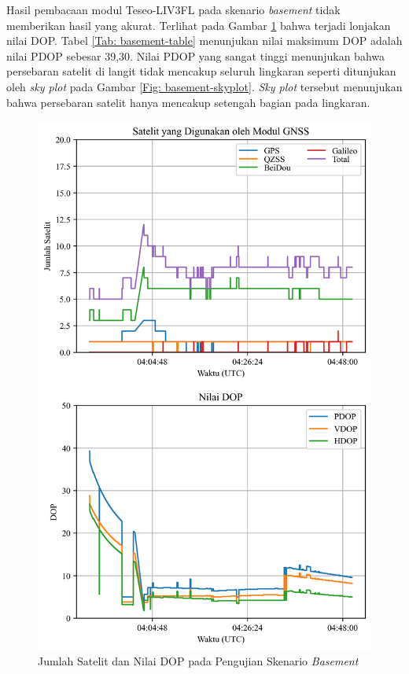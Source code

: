 Hasil pembacaan modul Teseo-LIV3FL pada skenario \textit{basement} tidak memberikan hasil yang akurat. Terlihat pada Gambar \ref{Fig: basement-sats_dop} bahwa terjadi lonjakan nilai DOP. Tabel \ref{Tab: basement-table} menunjukan nilai maksimum DOP adalah nilai PDOP sebesar 39,30. Nilai PDOP yang sangat tinggi menunjukan bahwa persebaran satelit di langit tidak mencakup seluruh lingkaran seperti ditunjukan oleh \textit{sky plot} pada Gambar \ref{Fig: basement-skyplot}. \textit{Sky plot} tersebut menunjukan bahwa persebaran satelit hanya mencakup setengah bagian pada lingkaran.

\begin{figure}[H]
	\centering
	\includegraphics[width=12cm]{contents/chapter-4/1-skenario-basement/sats_dop.png}
	\caption{Jumlah Satelit dan Nilai DOP pada Pengujian Skenario \textit{Basement}}
	\label{Fig: basement-sats_dop}
\end{figure}

